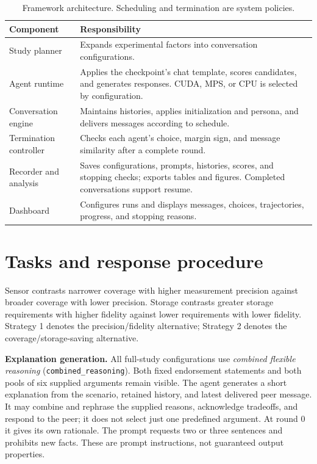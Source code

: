\documentclass[11pt,a4paper]{article}
\begin{document}
\begin{table}[htbp]
\centering\small
\begin{tabularx}{\linewidth}{@{}p{3.2cm}X@{}}
\toprule
Component & Responsibility\\
\midrule
Study planner & Expands experimental factors into conversation configurations.\\
Agent runtime & Applies the checkpoint's chat template, scores candidates, and generates responses. CUDA, MPS, or CPU is selected by configuration.\\
Conversation engine & Maintains histories, applies initialization and persona, and delivers messages according to schedule.\\
Termination controller & Checks each agent's choice, margin sign, and message similarity after a complete round.\\
Recorder and analysis & Saves configurations, prompts, histories, scores, and stopping checks; exports tables and figures. Completed conversations support resume.\\
Dashboard & Configures runs and displays messages, choices, trajectories, progress, and stopping reasons.\\
\bottomrule
\end{tabularx}
\caption{Framework architecture. Scheduling and termination are system policies.}
\end{table}

\section{Tasks and response procedure}
Sensor contrasts narrower coverage with higher measurement precision against broader coverage with lower precision. Storage contrasts greater storage requirements with higher fidelity against lower requirements with lower fidelity. Strategy 1 denotes the precision/fidelity alternative; Strategy 2 denotes the coverage/storage-saving alternative.

\textbf{Explanation generation.} All full-study configurations use \emph{combined flexible reasoning} (\texttt{combined\_reasoning}). Both fixed endorsement statements and both pools of six supplied arguments remain visible. The agent generates a short explanation from the scenario, retained history, and latest delivered peer message. It may combine and rephrase the supplied reasons, acknowledge tradeoffs, and respond to the peer; it does not select just one predefined argument. At round 0 it gives its own rationale. The prompt requests two or three sentences and prohibits new facts. These are prompt instructions, not guaranteed output properties.
\end{document}
